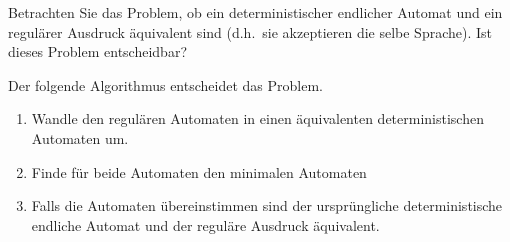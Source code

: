 Betrachten Sie das Problem, ob ein deterministischer endlicher Automat
und ein regulärer Ausdruck äquivalent sind (d.h.~sie akzeptieren die
selbe Sprache). Ist dieses Problem entscheidbar?


\begin{loesung}
Der folgende Algorithmus entscheidet das Problem.
\begin{enumerate}
\item Wandle den regulären Automaten in einen äquivalenten deterministischen
Automaten um.
\item Finde für beide Automaten den minimalen Automaten
\item Falls die Automaten übereinstimmen sind der ursprüngliche
deterministische endliche Automat und der reguläre Ausdruck
äquivalent.
\qedhere
\end{enumerate}
\end{loesung}
